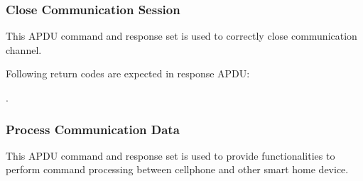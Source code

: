 \subsubsection{Close Communication Session}\label{secSessionClose}
This APDU command and response set is used to correctly close  communication channel.


\begin{table}[!htbp]
\caption{Close Session command APDU}
\label{close-session-apdu}
\end{table}

Following return codes are expected in response APDU:

.\begin{table}[!htbp]
\caption{Close Session Return Code}
\label{close-session-response-apdu}
\end{table}

\subsubsection{Process Communication Data }\sloppy
\begin{table}[!htbp]
\caption{Process data command APDUs}
\label{process-data-cmd-apdu}
\end{table}
This APDU command and response set is used to provide functionalities to perform command processing between cellphone and  other smart home device. 


